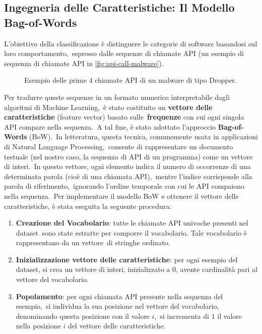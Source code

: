 \subsection{Ingegneria delle Caratteristiche: Il Modello Bag-of-Words}

L'obiettivo della classificazione è distinguere le categorie di software basandosi sul loro comportamento,\
espresso dalle sequenze di chiamate API (un esempio di sequenza di chiamate API in \autoref{fig:api-call-malware}).\

\begin{figure}[h!]
    \centering
    \caption{Esempio delle prime 4 chiamate API di un malware di tipo Dropper.}
    \label{fig:api-call-malware}
\end{figure}

Per tradurre queste sequenze in un formato numerico interpretabile dagli algoritmi di Machine Learning,\
è stato costituito un \textbf{vettore delle caratteristiche} (feature vector) basato sulle\
\textbf{frequenze} con cui ogni singola API compare nella sequenza.\
A tal fine, è stato adottato l'approccio \textbf{Bag-of-Words} (BoW).\
In letteratura, questa tecnica, comunemente usata in applicazioni di Natural Language Processing,\
consente di rappresentare un documento testuale (nel nostro caso, la sequenza di API di un programma) come un vettore di interi.\
In questo vettore, ogni elemento indica il numero di occorrenze di una determinata parola (cioè di una chiamata API),\
mentre l'indice corrisponde alla parola di riferimento,\
ignorando l'ordine temporale con cui le API compaiono nella sequenza.\
Per implementare il modello BoW e ottenere il vettore delle caratteristiche, è stata eseguita la seguente procedura:

\begin{enumerate}
    \item \textbf{Creazione del Vocabolario}: tutte le chiamate API univoche presenti nel dataset\
          sono state estratte per comporre il vocabolario. Tale vocabolario è rappresentano da un vettore\
          di stringhe ordinato.
    \item \textbf{Inizializzazione vettore delle caratteristiche}: per ogni esempio del dataset, si crea un vettore di interi,
          inizializzato a $0$, avente cardinalità pari al vettore del vocabolario.
    \item \textbf{Popolamento}: per ogni chiamata API presente nella sequenza del esempio,\
          si individua la sua posizione nel vettore del vocabolario, denominando questa posizione con il valore $i$,\
          si incrementa di $1$ il valore nella posizione $i$ del vettore delle caratteristiche.

\end{enumerate}

